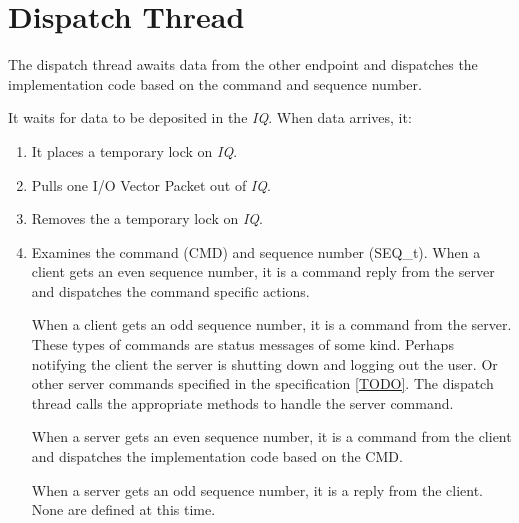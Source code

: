 \section{Dispatch Thread}\label{sec:DispatchThread}
The dispatch thread awaits data from the other
endpoint and dispatches the implementation code
based on the command and sequence number.

It waits for data to be deposited in the \textit{IQ}.
When data arrives, it:

\begin{enumerate}

\item It places a temporary lock on \textit{IQ}.
  
\item Pulls one I/O Vector Packet out of \textit{IQ}.

\item Removes the a temporary lock on \textit{IQ}.

\item Examines the command (CMD) and sequence number (SEQ\_t).
  When a client gets an even sequence number, it is a command
  reply from the server and dispatches the command
  specific actions.

  When a client gets an odd sequence number, it is a
  command from the server.
  These types of commands are status messages of some
  kind. Perhaps notifying the client the server is shutting down
  and logging out the user. Or other server commands
  specified in the specification \ref{TODO}.
  The dispatch thread calls the appropriate methods to handle
  the server command.

  When a server gets an even sequence number, it is a command
  from the client and dispatches the implementation
  code based on the CMD.

  When a server gets an odd sequence number, it is a
  reply from the client. None are defined at this time.

\end{enumerate}
